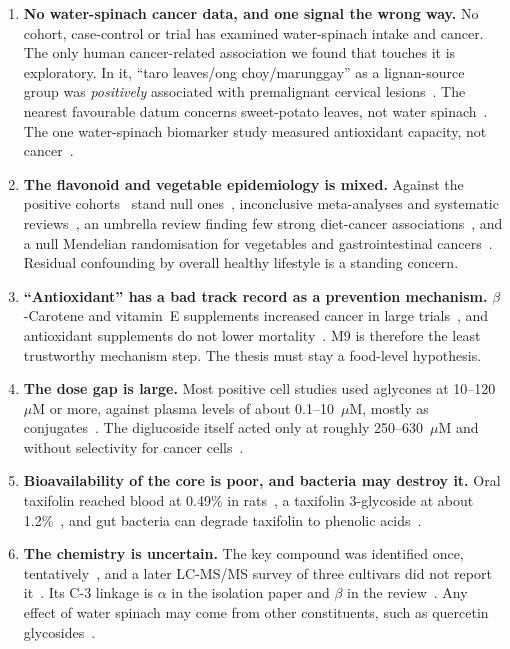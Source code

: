 \documentclass[11pt,a4paper]{article}
\begin{document}
\begin{enumerate}[label=\textbf{C\arabic*.}, leftmargin=2.4em]
\item \textbf{No water-spinach cancer data, and one signal the wrong way.} No cohort, case-control or trial has examined water-spinach intake and cancer. The only human cancer-related association we found that touches it is exploratory. In it, ``taro leaves/ong choy/marunggay'' as a lignan-source group was \emph{positively} associated with premalignant cervical lesions~\cite{hernandez2004}. The nearest favourable datum concerns sweet-potato leaves, not water spinach~\cite{jin2007}. The one water-spinach biomarker study measured antioxidant capacity, not cancer~\cite{woo1997}.
\item \textbf{The flavonoid and vegetable epidemiology is mixed.} Against the positive cohorts~\cite{knekt2002,bondonno2019,parmenter2025} stand null ones~\cite{wang2009,takachi2008}, inconclusive meta-analyses and systematic reviews~\cite{grosso2017,jin2012}, an umbrella review finding few strong diet-cancer associations~\cite{papadimitriou2021}, and a null Mendelian randomisation for vegetables and gastrointestinal cancers~\cite{wei2024}. Residual confounding by overall healthy lifestyle is a standing concern.
\item \textbf{``Antioxidant'' has a bad track record as a prevention mechanism.} $\beta$-Carotene and vitamin~E supplements increased cancer in large trials~\cite{alphatocopherolbetac1994,omenn1996,klein2011}, and antioxidant supplements do not lower mortality~\cite{bjelakovic2012}. M9 is therefore the least trustworthy mechanism step. The thesis must stay a food-level hypothesis.
\item \textbf{The dose gap is large.} Most positive cell studies used aglycones at 10--120~$\mu$M or more, against plasma levels of about 0.1--10~$\mu$M, mostly as conjugates~\cite{kroon2004,manach2005}. The diglucoside itself acted only at roughly 250--630~$\mu$M and without selectivity for cancer cells~\cite{prasad2005b}.
\item \textbf{Bioavailability of the core is poor, and bacteria may destroy it.} Oral taxifolin reached blood at 0.49\% in rats~\cite{yang2016}, a taxifolin 3-glycoside at about 1.2\%~\cite{shi2020}, and gut bacteria can degrade taxifolin to phenolic acids~\cite{braune2001}.
\item \textbf{The chemistry is uncertain.} The key compound was identified once, tentatively~\cite{prasad2005}, and a later LC-MS/MS survey of three cultivars did not report it~\cite{lawal2016}. Its C-3 linkage is $\alpha$ in the isolation paper and $\beta$ in the review~\cite{meira2012}. Any effect of water spinach may come from other constituents, such as quercetin glycosides~\cite{lawal2016,hefnygad2018}.

\end{enumerate}
\end{document}
